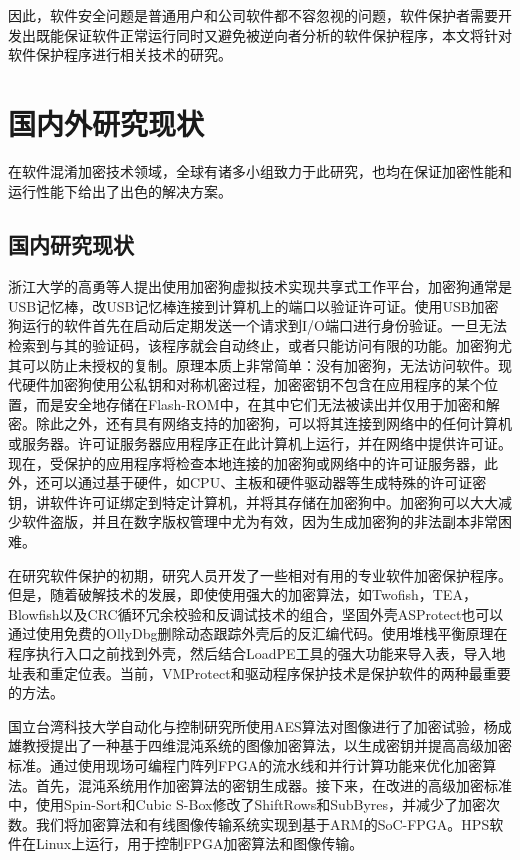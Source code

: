 
因此，软件安全问题是普通用户和公司软件都不容忽视的问题，软件保护者需要开发出既能保证软件正常运行同时又避免被逆向者分析的软件保护程序，本文将针对软件保护程序进行相关技术的研究。


\section{国内外研究现状}
\label{cha1:sec:relatedworks}
在软件混淆加密技术领域，全球有诸多小组致力于此研究，也均在保证加密性能和运行性能下给出了出色的解决方案。
\subsection{国内研究现状}

浙江大学的高勇等人提出使用加密狗虚拟技术实现共享式工作平台，加密狗通常是USB记忆棒，改USB记忆棒连接到计算机上的端口以验证许可证\cite{秦飞2018逆向工程和}。使用USB加密狗运行的软件首先在启动后定期发送一个请求到I/O端口进行身份验证。一旦无法检索到与其的验证码，该程序就会自动终止，或者只能访问有限的功能\cite{Jeong2014Code}。加密狗尤其可以防止未授权的复制。原理本质上非常简单：没有加密狗，无法访问软件。现代硬件加密狗使用公私钥和对称机密过程，加密密钥不包含在应用程序的某个位置\cite{曾强2020Linux}，而是安全地存储在Flash-ROM中，在其中它们无法被读出并仅用于加密和解密。除此之外，还有具有网络支持的加密狗，可以将其连接到网络中的任何计算机或服务器。许可证服务器应用程序正在此计算机上运行，并在网络中提供许可证。现在，受保护的应用程序将检查本地连接的加密狗或网络中的许可证服务器\cite{2019Analyzing}，此外，还可以通过基于硬件，如CPU、主板和硬件驱动器等生成特殊的许可证密钥，讲软件许可证绑定到特定计算机，并将其存储在加密狗中。加密狗可以大大减少软件盗版，并且在数字版权管理中尤为有效，因为生成加密狗的非法副本非常困难。

在研究软件保护的初期，研究人员开发了一些相对有用的专业软件加密保护程序。但是，随着破解技术的发展，即使使用强大的加密算法，如Twofish，TEA，Blowfish以及CRC循环冗余校验和反调试技术的组合，坚固外壳ASProtect也可以通过使用免费的OllyDbg删除动态跟踪外壳后的反汇编代码。使用堆栈平衡原理在程序执行入口之前找到外壳，然后结合LoadPE工具的强大功能来导入表，导入地址表和重定位表。当前，VMProtect和驱动程序保护技术是保护软件的两种最重要的方法\cite{2020Call}。

国立台湾科技大学自动化与控制研究所使用AES算法对图像进行了加密试验，杨成雄教授提出了一种基于四维混沌系统的图像加密算法\cite{2017Access}，以生成密钥并提高高级加密标准。通过使用现场可编程门阵列FPGA的流水线和并行计算功能来优化加密算法。首先，混沌系统用作加密算法的密钥生成器。接下来，在改进的高级加密标准中\cite{2018ORLIS}，使用Spin-Sort和Cubic S-Box修改了ShiftRows和SubByres，并减少了加密次数。我们将加密算法和有线图像传输系统实现到基于ARM的SoC-FPGA。HPS软件在Linux上运行，用于控制FPGA加密算法和图像传输。


